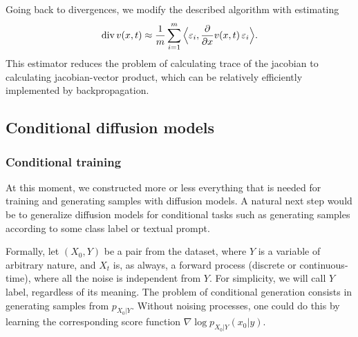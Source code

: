 Going back to divergences, we modify the described algorithm with estimating 
\[
    \mathrm{div} \, v(x, t) \approx \frac{1}{m}\sum\limits_{i = 1}^{m} \Big\langle \varepsilon_i, \frac{\partial}{\partial x} v(x, t)\, \varepsilon_i \Big\rangle.
\]
This estimator reduces the problem of calculating trace of the jacobian to calculating jacobian-vector product, which can be relatively efficiently implemented by backpropagation.

\subsection{Conditional diffusion models}
\subsubsection{Conditional training}
At this moment, we constructed more or less everything that is needed for training and generating samples with diffusion models. A natural next step would be to generalize diffusion models for conditional tasks such as generating samples according to some class label or textual prompt.

Formally, let $(X_0, Y)$ be a pair from the dataset, where $Y$ is a variable of arbitrary nature, and $X_t$ is, as always, a forward process (discrete or continuous-time), where all the noise is independent from $Y$. For simplicity, we will call $Y$ label, regardless of its meaning. The problem of conditional generation consists in generating samples from $p_{X_0 | Y}$. Without noising processes, one could do this by learning the corresponding score function $\nabla \log p_{X_0 | Y}(x_0 | y)$.

